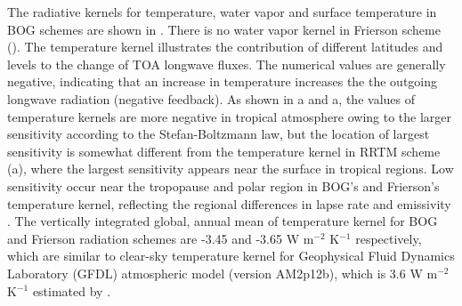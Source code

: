 
The radiative kernels for temperature, water vapor and surface temperature in BOG schemes are shown in . There is no water vapor kernel in Frierson scheme (). The temperature kernel illustrates the contribution of different latitudes and levels to the change of TOA longwave fluxes. The numerical values are generally negative, indicating that an increase in temperature increases the the outgoing longwave radiation (negative feedback). As shown in a and a, the values of temperature kernels are more negative in tropical atmosphere owing to the larger sensitivity according to the Stefan-Boltzmann law, but the location of largest sensitivity is somewhat different from the temperature kernel in RRTM scheme (a), where the largest sensitivity appears near the surface in tropical regions. Low sensitivity occur near the tropopause and polar region in BOG's and Frierson's temperature kernel, reflecting the regional differences in lapse rate and emissivity \citep{Soden2008}. The vertically integrated global, annual mean of temperature kernel for BOG and Frierson radiation schemes are -3.45 and -3.65 W m$^{-2}$ K$^{-1}$ respectively, which are similar to clear-sky temperature kernel for Geophysical Fluid Dynamics Laboratory (GFDL) atmospheric model (version AM2p12b), which is 3.6 W m$^{-2}$ K$^{-1}$ estimated by \cite{Soden2008}.

